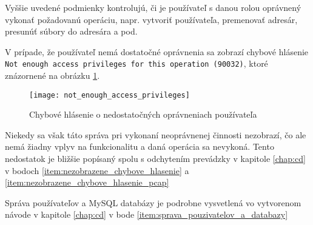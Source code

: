 Vyššie uvedené podmienky kontrolujú, či je používateľ s danou rolou oprávnený vykonať požadovanú operáciu, napr. vytvoriť používateľa, premenovať adresár, presunúť súbory do adresára a pod.

V prípade, že používateľ nemá dostatočné oprávnenia sa zobrazí chybové hlásenie \texttt{Not enough access privileges for this operation (90032)}, ktoré znázornené na obrázku \ref{obr:not_enough_access_privileges}.

\begin{figure}
    \centering
    \texttt{[image: not\_enough\_access\_privileges]}
    \caption{Chybové hlásenie o nedostatočných oprávneniach používateľa}
    \label{obr:not_enough_access_privileges}
\end{figure}

Niekedy sa však táto správa pri vykonaní neoprávnenej činnosti nezobrazí, čo ale nemá žiadny vplyv na funkcionalitu a daná operácia sa nevykoná. Tento nedostatok je bližšie popísaný spolu s odchytením prevádzky v kapitole \ref{chap:cd} v bodoch \ref{item:nezobrazene_chybove_hlasenie} a \ref{item:nezobrazene_chybove_hlasenie_pcap}

Správa používateľov a MySQL databázy je podrobne vysvetlená vo vytvorenom návode v kapitole \ref{chap:cd} v bode \ref{item:sprava_pouzivatelov_a_databazy}
